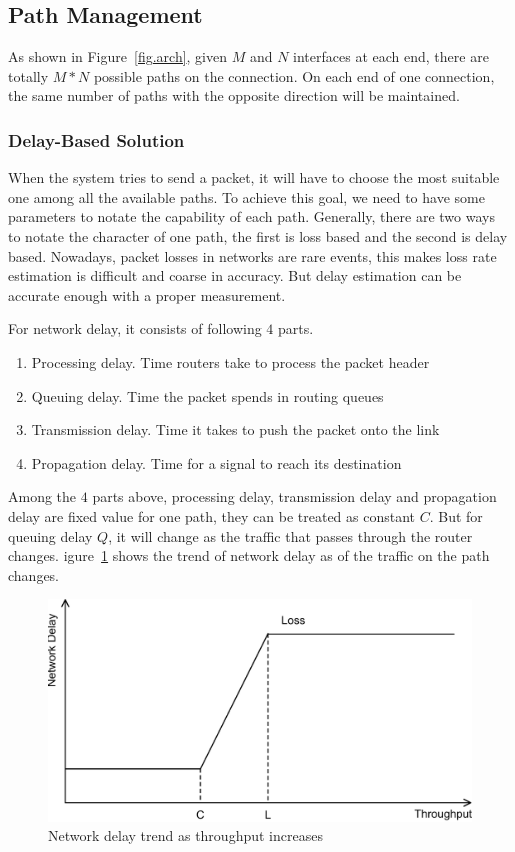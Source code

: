 \subsection{Path Management}
\label{sec:path}

As shown in Figure~\ref{fig.arch}, given $M$ and $N$ interfaces at each end, there are totally $M*N$ possible paths on the connection. On each end of one connection, the same number of paths with the opposite direction will be maintained.

\subsubsection{Delay-Based Solution}

When the system tries to send a packet, it will have to choose the most suitable one among all the available paths. To achieve this goal, we need to have some parameters to notate the capability of each path. Generally, there are two ways to notate the character of one path, the first is loss based and the second is delay based. Nowadays, packet losses in networks are rare events, this makes loss rate estimation is difficult and coarse in accuracy. But delay estimation can be accurate enough with a proper measurement.

For network delay, it consists of following $4$ parts.

\begin{enumerate}
\item Processing delay. Time routers take to process the packet header
\item Queuing delay. Time the packet spends in routing queues
\item Transmission delay. Time it takes to push the packet onto the link
\item Propagation delay. Time for a signal to reach its destination
\end{enumerate}

Among the $4$ parts above, processing delay, transmission delay and propagation delay are fixed value for one path, they can be treated as constant $C$. But for queuing delay $Q$, it will change as the traffic that passes through the router changes. igure~\ref{fig.delay} shows the trend of network delay as of the traffic on the path changes.

\begin{figure}
\centering
\includegraphics[width=0.8\linewidth]{fig/delay.eps}
\caption{Network delay trend as throughput increases}
\label{fig.delay}
\end{figure}

